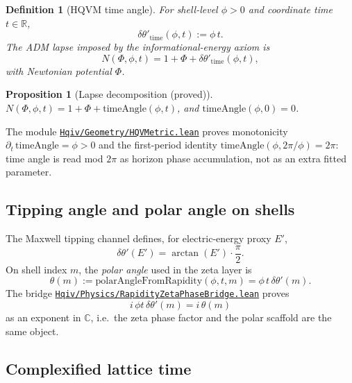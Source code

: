 \documentclass[11pt]{amsart}
\newcommand{\leanrepo}{https://github.com/HQIV/hqiv-lean/blob/main}
\newcommand{\leanfile}[1]{\href{\leanrepo/#1}{\nolinkurl{#1}}}
\newtheorem{proposition}[theorem]{Proposition}
\newtheorem{definition}[theorem]{Definition}
\begin{document}
\begin{definition}[HQVM time angle]
\label{def:time-angle}
For shell-level $\phi>0$ and coordinate time $t\in\mathbb R$,
\begin{equation}
  \delta\theta'_{\mathrm{time}}(\phi,t):=\phi\,t.
  \label{eq:time-angle}
\end{equation}
The ADM lapse imposed by the informational-energy axiom is
\begin{equation}
  N(\Phi,\phi,t)=1+\Phi+\delta\theta'_{\mathrm{time}}(\phi,t),
  \label{eq:lapse}
\end{equation}
with Newtonian potential $\Phi$.
\end{definition}

\begin{proposition}[Lapse decomposition (proved)]
\label{prop:lapse-decomp}
$N(\Phi,\phi,t)=1+\Phi+\mathrm{timeAngle}(\phi,t)$, and
$\mathrm{timeAngle}(\phi,0)=0$.
\end{proposition}

The module \leanfile{Hqiv/Geometry/HQVMetric.lean} proves monotonicity
$\partial_t\,\mathrm{timeAngle}=\phi>0$ and the first-period identity
$\mathrm{timeAngle}(\phi,2\pi/\phi)=2\pi$: time angle is read mod $2\pi$ as horizon phase
accumulation, not as an extra fitted parameter.

\subsection{Tipping angle and polar angle on shells}

The Maxwell tipping channel defines, for electric-energy proxy $E'$,
\begin{equation}
  \delta\theta'(E')=\arctan(E')\cdot\frac{\pi}{2}.
  \label{eq:delta-theta-prime}
\end{equation}
On shell index $m$, the \emph{polar angle} used in the zeta layer is
\begin{equation}
  \theta(m):=\mathrm{polarAngleFromRapidity}(\phi,t,m)
  =\phi\,t\,\delta\theta'(m).
  \label{eq:polar-angle}
\end{equation}
The bridge \leanfile{Hqiv/Physics/RapidityZetaPhaseBridge.lean} proves
\begin{equation}
  i\,\phi t\,\delta\theta'(m)
  = i\,\theta(m)
\end{equation}
as an exponent in $\mathbb C$, i.e.\ the zeta phase factor and the polar scaffold are the same
object.

\subsection{Complexified lattice time}
\end{document}
